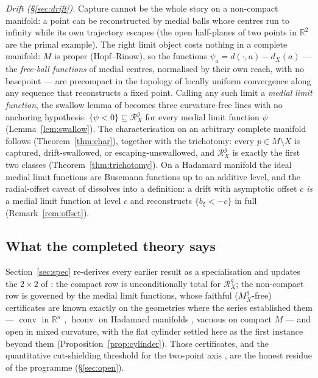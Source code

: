 \documentclass[11pt]{article}
\theoremstyle{remark}
\newcommand{\R}{\mathbb{R}}
\newcommand{\X}{X}
\newcommand{\Mg}{M^{g}_{\X}}
\newcommand{\Rg}{\mathcal{R}^{g}_{\X}}
\newcommand{\dX}{d_{\X}}
\newcommand{\conv}{\operatorname{conv}}
\newcommand{\hconv}{\operatorname{hconv}}
\begin{document}
\emph{Drift (\S\ref{sec:drift}).} Capture cannot be the whole story on
a non-compact manifold: a point can be reconstructed by medial balls
whose centres run to infinity while its own trajectory escapes (the
open half-planes of two points in $\R^{2}$ are the primal example).
The right limit object costs nothing in a complete manifold: $M$ is
proper (Hopf--Rinow), so the functions
$\psi_{a}=d(\cdot,a)-\dX(a)$ --- the \emph{free-ball functions} of
medial centres, normalised by their own reach, with no basepoint ---
are precompact in the topology of locally uniform convergence along any
sequence that reconstructs a fixed point. Calling any such limit a
\emph{medial limit function}, the swallow lemma of \cite{R3} becomes
three curvature-free lines with no anchoring hypothesis:
$\{\psi<0\}\subseteq\Rg$ for every medial limit function $\psi$
(Lemma~\ref{lem:swallow}). The characterisation on an arbitrary
complete manifold follows (Theorem~\ref{thm:char}), together with the
trichotomy: every $p\in M\setminus\X$ is captured, drift-swallowed, or
escaping-unswallowed, and $\Rg$ is exactly the first two classes
(Theorem~\ref{thm:trichotomy}). On a Hadamard manifold the ideal medial
limit functions are Busemann functions up to an additive level, and the
radial-offset caveat of \cite[Thm.~3.4]{R3} dissolves into a
definition: a drift with
asymptotic offset $c$ \emph{is} a medial limit function at level $c$
and reconstructs $\{b_{\xi}<-c\}$ in full
(Remark~\ref{rem:offset}).

\subsection*{What the completed theory says}

Section~\ref{sec:spec} re-derives every earlier result as a
specialisation and updates the $2\times2$ of \cite{Tri}: the compact
row is unconditionally total for $\Rg$; the non-compact row is governed
by the medial limit functions, whose faithful ($\Mg$-free)
certificates are known exactly on the geometries where the series
established them --- $\conv$ in $\R^{n}$ \cite{Bia}, $\hconv$ on
Hadamard manifolds \cite{R3}, vacuous on compact $M$ --- and open in
mixed curvature, with the flat cylinder settled here as the first
instance beyond them (Proposition~\ref{prop:cylinder}). Those
certificates, and the quantitative
cut-shielding threshold for the two-point axis \cite[Rem.~6.6]{Tri},
are the honest residue of the programme
(\S\ref{sec:open}).
\end{document}
